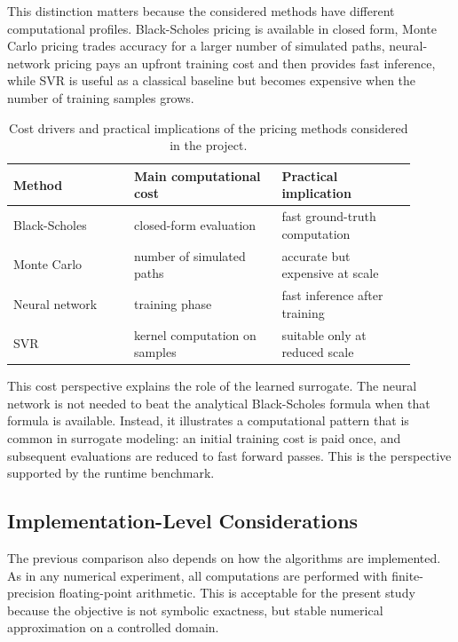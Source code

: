 This distinction matters because the considered methods have different computational profiles.
Black-Scholes pricing is available in closed form, Monte Carlo pricing trades accuracy for a larger number of simulated paths, neural-network pricing pays an upfront training cost and then provides fast inference, while SVR is useful as a classical baseline but becomes expensive when the number of training samples grows.

\begin{table}[H]
    \centering
    \begin{tabular}{
        >{\raggedright\arraybackslash}p{0.27\linewidth}
        >{\raggedright\arraybackslash}p{0.33\linewidth}
        >{\raggedright\arraybackslash}p{0.30\linewidth}
        }
        \toprule
        Method         & Main computational cost       & Practical implication           \\
        \midrule
        Black-Scholes  & closed-form evaluation        & fast ground-truth computation   \\
        \projecttablerowsep
        Monte Carlo    & number of simulated paths     & accurate but expensive at scale \\
        \projecttablerowsep
        Neural network & training phase                & fast inference after training   \\
        \projecttablerowsep
        SVR            & kernel computation on samples & suitable only at reduced scale  \\
        \bottomrule
    \end{tabular}
    \caption{Cost drivers and practical implications of the pricing methods considered in the project.}
    \label{tab:computational-profile}
\end{table}

This cost perspective explains the role of the learned surrogate.
The neural network is not needed to beat the analytical Black-Scholes formula when that formula is available.
Instead, it illustrates a computational pattern that is common in surrogate modeling: an initial training cost is paid once, and subsequent evaluations are reduced to fast forward passes.
This is the perspective supported by the runtime benchmark.

\subsection{Implementation-Level Considerations}

The previous comparison also depends on how the algorithms are implemented.
As in any numerical experiment, all computations are performed with finite-precision floating-point arithmetic.
This is acceptable for the present study because the objective is not symbolic exactness, but stable numerical approximation on a controlled domain.

